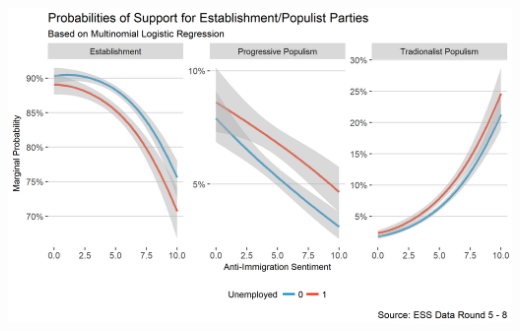 \documentclass[]{article}
\begin{document}
\vspace{1cm}

\begin{center}\includegraphics[height=0.35\textheight]{images/interaction_abstract} \end{center}
\end{document}
